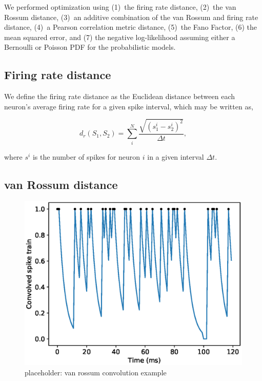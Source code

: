 \documentclass[mphil,deptreport,ianc]{infthesis} %
\begin{document}
We performed optimization using (1)~the firing rate distance, (2)~the van Rossum distance, (3)~an additive combination of the van Rossum and firing rate distance, (4)~a Pearson correlation metric distance, (5)~the Fano Factor, (6) the mean squared error, and (7) the negative log-likelihood assuming either a Bernoulli or Poisson PDF for the probabilistic models.

\subsection{Firing rate distance}

We define the firing rate distance as the Euclidean distance between each neuron's average firing rate for a given spike interval, which may be written as,

\begin{equation}
    d_r(S_1, S_2) = \sum_i^N{\frac{\sqrt{(s_1^i - s_2^i)^2}}{\Delta t}},
\end{equation}

where $s^i$ is the number of spikes for neuron $i$ in a given interval $\Delta t$.

\subsection{van Rossum distance}

\begin{figure}
    \centering
    \vskip -0.1in
    \includegraphics[width=0.9\columnwidth]{figures/samples/neur_vr_conv_sample.eps}
    \vskip -0.1in
    \caption{placeholder: van rossum convolution example}
    \label{fig:vrd_conv_sample}
    \vskip -0.2in
\end{figure}
\end{document}
